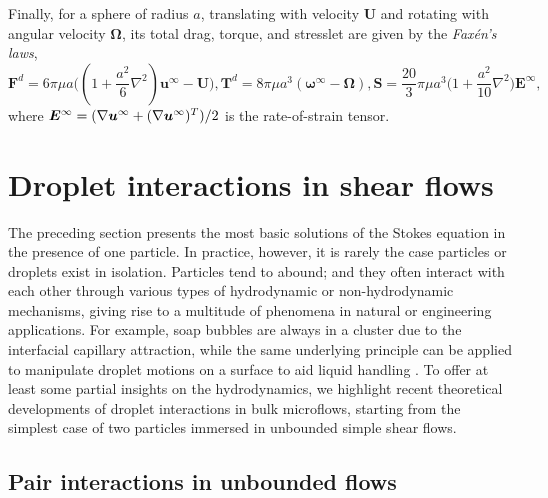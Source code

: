 Finally, for a sphere of radius $a$, translating with velocity $\bm U$ and rotating with angular velocity $\bm \Omega$, its total drag, torque, and stresslet are given by the \emph{Fax\'{e}n's laws},
\begin{subequations} \label{eq:faxen}
 \begin{equation}
   {\bm F}^{d} = 6\pi\mu a\bigg( (1+\frac{a^2}{6}\nabla^2){\bm u^\infty - {\bm U}} \bigg) ,
 \end{equation}
 \begin{equation}
  {\bm T}^{d} = 8\pi\mu a^3 ({\bm \omega}^\infty - {\bm \Omega}),
 \end{equation}
 \begin{equation}
   {\bm S} = \frac{20}{3}\pi\mu a^3 \bigg( 1+\frac{a^2}{10}\nabla^2 \bigg) {\bm E}^\infty ,
 \end{equation}
\end{subequations}
where $\small {\bm E}^\infty=(\nabla {\bm u}^\infty + (\nabla {\bm u}^\infty)^T)/2$ is the rate-of-strain tensor.


\section{Droplet interactions in shear flows}

The preceding section presents the most basic solutions of the Stokes equation in the presence of one particle.
In practice, however, it is rarely the case particles or droplets exist in isolation.
Particles tend to abound; and they often interact with each other through various types of hydrodynamic or non-hydrodynamic mechanisms, giving rise to a multitude of phenomena in natural or engineering applications.
For example, soap bubbles are always in a cluster due to the interfacial capillary attraction, while the same underlying principle can be applied to manipulate droplet motions on a surface to aid liquid handling \citep{vapour-sensing}.
To offer at least some partial insights on the hydrodynamics, we highlight recent theoretical developments of droplet interactions in bulk microflows, starting from the simplest case of two particles immersed in unbounded simple shear flows.

\subsection{Pair interactions in unbounded flows}

